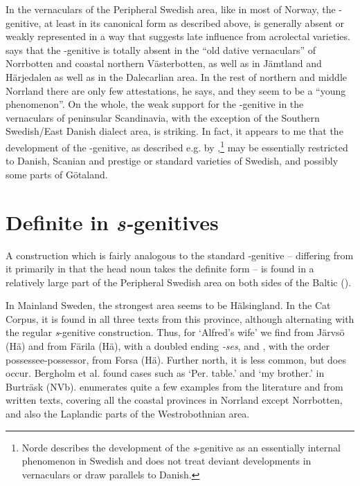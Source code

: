 In the vernaculars of the Peripheral Swedish area, like in most of Norway, the -genitive, at least in its canonical form as described above, is generally absent or weakly represented in a way that suggests late influence from acrolectal varieties. \citet[41]{Delsing2003a} says that the -genitive is totally absent in the “old dative vernaculars” of Norrbotten and coastal northern Västerbotten, as well as in Jämtland and Härjedalen as well as in the Dalecarlian area. In the rest of northern and middle Norrland there are only few attestations, he says, and they seem to be a “young phenomenon”. On the whole, the weak support for the -genitive in the vernaculars of peninsular Scandinavia, with the exception of the Southern Swedish/East Danish dialect area, is striking. In fact, it appears to me that the development of the -genitive, as described e.g. by \citet{Norde1997},\footnote{ Norde describes the development of the \textit{s}{}-genitive as an essentially internal phenomenon in Swedish and does not treat deviant developments in vernaculars or draw parallels to Danish.} may be essentially restricted to Danish, Scanian and prestige or standard varieties of Swedish, and possibly some parts of Götaland. 

\section{Definite in \textit{s-}genitives}
\label{sec:5.3}

A construction which is fairly analogous to the standard -genitive – differing from it primarily in that the head noun takes the definite form – is found in a relatively large part of the Peripheral Swedish area on both sides of the Baltic (\citealt[27]{Delsing2003a}).

In Mainland Sweden, the strongest area seems to be Hälsingland. In the Cat Corpus, it is found in all three texts from this province, although alternating with the regular \textit{s}{}-genitive construction. Thus, for ‘Alfred’s wife’ we find  from Järvsö (Hä) and  from Färila (Hä), with a doubled ending\textit{ {}-ses}, and , with the order possessee-possessor, from Forsa (Hä). Further north, it is less common, but does occur.  Bergholm et al. found cases such as ‘Per.{\gen} table.{}’ and  ‘my brother.{}’ in Burträsk (NVb). \citet[27]{Delsing2003a} enumerates quite a few examples from the literature and from written texts, covering all the coastal provinces in Norrland except Norrbotten, and also the Laplandic parts of the Westrobothnian area. 


